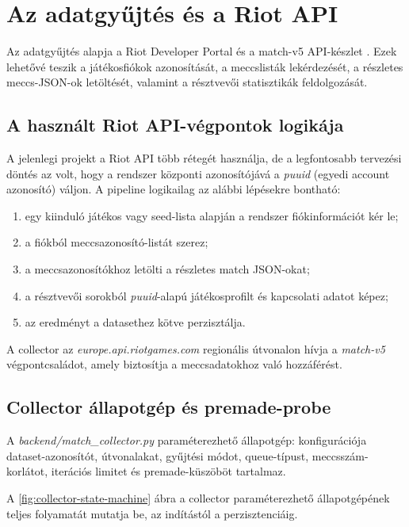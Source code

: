 \chapter{Az adatgyűjtés és a Riot API}

Az adatgyűjtés alapja a Riot Developer Portal és a match-v5 API-készlet \cite{riotportal,riotapi}. Ezek lehetővé teszik a játékosfiókok azonosítását, a meccslisták lekérdezését, a részletes meccs-JSON-ok letöltését, valamint a résztvevői statisztikák feldolgozását.

\section{A használt Riot API-végpontok logikája}

A jelenlegi projekt a Riot API több rétegét használja, de a legfontosabb tervezési döntés az volt, hogy a rendszer központi azonosítójává a \textit{puuid} (egyedi account azonosító) váljon. A pipeline logikailag az alábbi lépésekre bontható:

\begin{enumerate}
    \item egy kiinduló játékos vagy seed-lista alapján a rendszer fiókinformációt kér le;
    \item a fiókból meccsazonosító-listát szerez;
    \item a meccsazonosítókhoz letölti a részletes match JSON-okat;
    \item a résztvevői sorokból \textit{puuid}-alapú játékosprofilt és kapcsolati adatot képez;
    \item az eredményt a datasethez kötve perzisztálja.
\end{enumerate}

A collector az \textit{europe.api.riotgames.com} regionális útvonalon hívja a \textit{match-v5} végpontcsaládot, amely biztosítja a meccsadatokhoz való hozzáférést.

\section{Collector állapotgép és premade-probe}

A \textit{backend/match\_collector.py} paraméterezhető állapotgép: konfigurációja dataset-azonosítót, útvonalakat, gyűjtési módot, queue-típust, meccsszám-korlátot, iterációs limitet és premade-küszöböt tartalmaz.

A \ref{fig:collector-state-machine} ábra a collector paraméterezhető állapotgépének teljes folyamatát mutatja be, az indítástól a perzisztenciáig.

